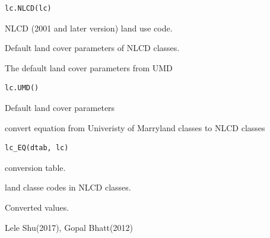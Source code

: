 \documentclass[a4paper]{book}
\begin{document}
%
\begin{Usage}
\begin{verbatim}
lc.NLCD(lc)
\end{verbatim}
\end{Usage}
%
\begin{Arguments}
\begin{ldescription}
\item[\code{lc}] NLCD (2001 and later version) land use code.
\end{ldescription}
\end{Arguments}
%
\begin{Value}
Default land cover parameters of NLCD classes.
\end{Value}
%
\begin{Description}\relax
The default land cover parameters from UMD
\end{Description}
%
\begin{Usage}
\begin{verbatim}
lc.UMD()
\end{verbatim}
\end{Usage}
%
\begin{Value}
Default land cover parameters
\end{Value}
%
\begin{Description}\relax
convert equation from Univeristy of Marryland classes to NLCD classes
\end{Description}
%
\begin{Usage}
\begin{verbatim}
lc_EQ(dtab, lc)
\end{verbatim}
\end{Usage}
%
\begin{Arguments}
\begin{ldescription}
\item[\code{dtab}] conversion table.

\item[\code{lc}] land classe codes in NLCD classes.
\end{ldescription}
\end{Arguments}
%
\begin{Value}
Converted values.
\end{Value}
%
\begin{References}\relax
Lele Shu(2017), Gopal Bhatt(2012)
\end{References}
\end{document}
